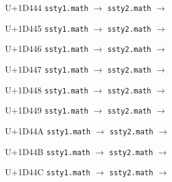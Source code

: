 \documentclass{article}
\begin{document}
\begin{substitutions}
\goodbreak

U+1D444  \linebreak
    \texttt{ssty1.math} $\to$  \linebreak
    \texttt{ssty2.math} $\to$  

\goodbreak

U+1D445  \linebreak
    \texttt{ssty1.math} $\to$  \linebreak
    \texttt{ssty2.math} $\to$  

\goodbreak

U+1D446  \linebreak
    \texttt{ssty1.math} $\to$  \linebreak
    \texttt{ssty2.math} $\to$  

\goodbreak

U+1D447  \linebreak
    \texttt{ssty1.math} $\to$  \linebreak
    \texttt{ssty2.math} $\to$  

\goodbreak

U+1D448  \linebreak
    \texttt{ssty1.math} $\to$  \linebreak
    \texttt{ssty2.math} $\to$  

\goodbreak

U+1D449  \linebreak
    \texttt{ssty1.math} $\to$  \linebreak
    \texttt{ssty2.math} $\to$  

\goodbreak

U+1D44A  \linebreak
    \texttt{ssty1.math} $\to$  \linebreak
    \texttt{ssty2.math} $\to$  

\goodbreak

U+1D44B  \linebreak
    \texttt{ssty1.math} $\to$  \linebreak
    \texttt{ssty2.math} $\to$  

\goodbreak

U+1D44C  \linebreak
    \texttt{ssty1.math} $\to$  \linebreak
    \texttt{ssty2.math} $\to$  


\end{substitutions}
\end{document}
